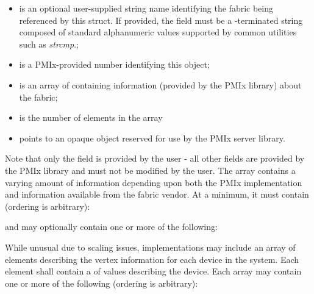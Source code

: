 \begin{itemize}
    \item {} is an optional user-supplied string name identifying the fabric being referenced by this struct. If provided, the field must be a -terminated string composed of standard alphanumeric values supported by common utilities such as \textit{strcmp}.;
    \item {} is a \ac{PMIx}-provided number identifying this object;
    \item {} is an array of  containing information (provided by the \ac{PMIx} library) about the fabric;
    \item {} is the number of elements in the  array
    \item {} points to an opaque object reserved for use by the \ac{PMIx} server library.
\end{itemize}

Note that only the  field is provided by the user - all other fields are provided by the \ac{PMIx} library and must not be modified by the user. The  array contains a varying amount of information depending upon both the \ac{PMIx} implementation and information available from the fabric vendor. At a minimum, it must contain (ordering is arbitrary):

\reqattrstart


\reqattrend

and may optionally contain one or more of the following:

\optattrstart
{}

While unusual due to scaling issues, implementations may include an array of  elements describing the vertex information for each device in the system. Each element shall contain a  of  values describing the device. Each array may contain one or more of the following (ordering is arbitrary):


